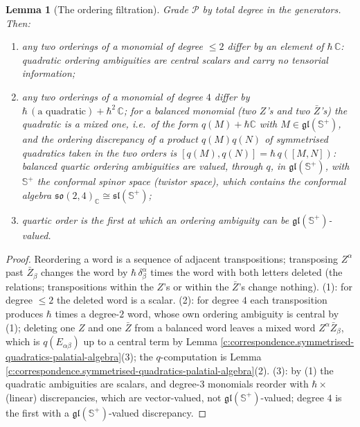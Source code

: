 \documentclass[11pt]{article}
\newtheorem{lemma}[theorem]{Lemma}
\theoremstyle{definition}
\theoremstyle{plain}
\newcommand{\changedmark}[2]{\marginpar{\raggedright\scriptsize\color{#1}#2}}
\providecommand{\C}{}\renewcommand{\C}{\mathbb{C}}
\providecommand{\CS}{}\renewcommand{\CS}{{\mathbb{S}^{+}}}
\begin{document}
\begin{lemma}[The ordering filtration]\label{c:correspondence.ordering-filtration}
\changedmark{gray}{reworded}
Grade $\mathcal{P}$ by total degree in the generators. Then:
\begin{enumerate}
\item any two orderings of a monomial of degree $\le 2$ differ by an element of $\hbar\,\C$: quadratic ordering ambiguities are central scalars and carry no tensorial information;
\item any two orderings of a monomial of degree $4$ differ by $\hbar\,(\text{a quadratic}) + \hbar^2\,\C$; for a \emph{balanced} monomial (two $Z$'s and two $\bar Z$'s) the quadratic is a mixed one, i.e.\ of the form $q(M) + \hbar\C$ with $M \in \mathfrak{gl}(\CS)$, and the ordering discrepancy of a product $q(M)q(N)$ of symmetrised quadratics taken in the two orders is $[q(M), q(N)] = \hbar\,q([M,N])$: balanced quartic ordering ambiguities are valued, through $q$, in $\mathfrak{gl}(\CS)$, with $\CS$ the conformal spinor space (twistor space), which contains the conformal algebra $\mathfrak{so}(2,4)_\C \cong \mathfrak{sl}(\CS)$;
\item quartic order is the \emph{first} at which an ordering ambiguity can be $\mathfrak{gl}(\CS)$-valued.
\end{enumerate}
\end{lemma}
\begin{proof}
Reordering a word is a sequence of adjacent transpositions; transposing $Z^\alpha$ past $\bar Z_\beta$ changes the word by $\hbar\,\delta^\alpha_\beta$ times the word with both letters deleted (the relations; transpositions within the $Z$'s or within the $\bar Z$'s change nothing). (1): for degree $\le 2$ the deleted word is a scalar. (2): for degree $4$ each transposition produces $\hbar$ times a degree-$2$ word, whose own ordering ambiguity is central by (1); deleting one $Z$ and one $\bar Z$ from a balanced word leaves a mixed word $Z^\alpha\bar Z_\beta$, which is $q(E_{\alpha\beta})$ up to a central term by Lemma \ref{c:correspondence.symmetrised-quadratics-palatial-algebra}(3); the $q$-computation is Lemma \ref{c:correspondence.symmetrised-quadratics-palatial-algebra}(2). (3): by (1) the quadratic ambiguities are scalars, and degree-$3$ monomials reorder with $\hbar\times$(linear) discrepancies, which are vector-valued, not $\mathfrak{gl}(\CS)$-valued; degree $4$ is the first with a $\mathfrak{gl}(\CS)$-valued discrepancy.

\end{proof}
\end{document}
